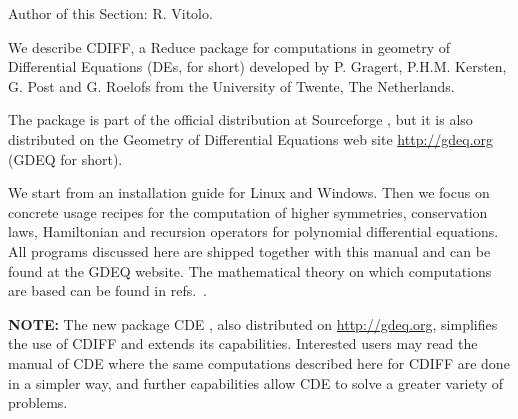 



\let\DeclareMathOperator\newcommand

\providecommand{\cprime}{\/{\mathsurround=0pt$'$}}

\providecommand*{\pd}[2]{\mathchoice{\frac{\partial#1}{\partial#2}}
  {\partial#1/\partial#2}{\partial#1/\partial#2}
  {\partial#1/\partial#2}}


\providecommand{\cdiff}{CDIFF\xspace}




  Author of this Section: R. Vitolo.

  We describe \cdiff, a Reduce package for computations in geometry of
  Differential Equations (DEs, for short) developed by P. Gragert,
  P.H.M. Kersten, G. Post and G. Roelofs from the University of Twente, The
  Netherlands.

  The package is part of the official \REDUCE distribution at Sourceforge
  \cite{red}, but it is also distributed on the Geometry of Differential
  Equations web site \url{http://gdeq.org} (GDEQ for short).

  We start from an installation guide for Linux and Windows. Then we focus on
  concrete usage recipes for the computation of higher symmetries, conservation
  laws, Hamiltonian and recursion operators for polynomial differential
  equations. All programs discussed here are shipped together with this manual
  and can be found at the GDEQ website. The mathematical theory on which
  computations are based can be found in refs.~\cite{Many,KKV}.

  \textbf{NOTE:} The new \REDUCE package CDE \cite{Vit}, also distributed on
  \url{http://gdeq.org}, simplifies the use of \cdiff and extends its
  capabilities. Interested users may read the manual of CDE where the same
  computations described here for \cdiff are done in a simpler way, and further
  capabilities allow CDE to solve a greater variety of problems.

